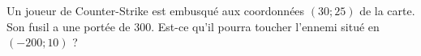 
\begin{exercice}\label{exosmath-0474}

    Un joueur de Counter-Strike est embusqué aux coordonnées \( (30;25)\) de la carte. Son fusil a une portée de \unit{300}{\meter}. Est-ce qu'il pourra toucher l'ennemi situé en \( (-200;10)\) ?

\end{exercice}
